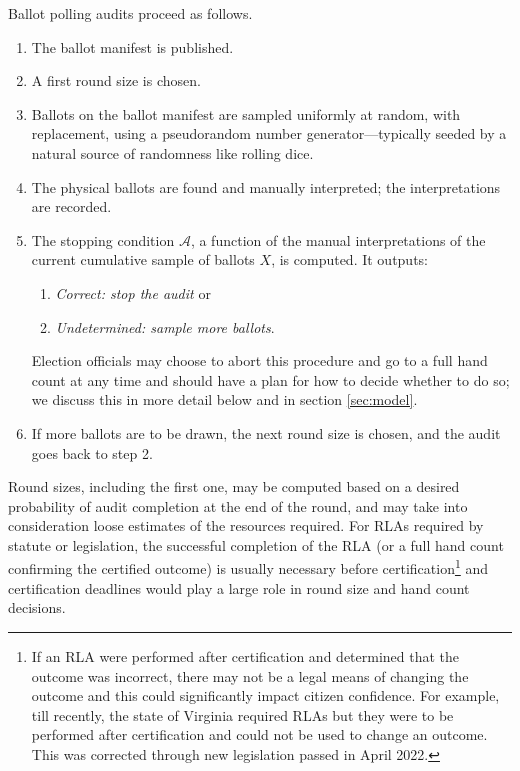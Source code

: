 Ballot polling audits proceed as follows. 
\begin{enumerate}
\item The ballot manifest is published. 
\item A first round size \cite{usenix_minerva} is chosen. %
\item Ballots on the ballot manifest are sampled uniformly at random, with replacement, using a pseudorandom number generator---typically seeded by a natural source of randomness like rolling dice.
\item The physical ballots are found and manually interpreted; the interpretations are recorded. 
\item The stopping condition $\mathcal{A}$, a function of the manual interpretations of the current cumulative sample of ballots $X$, is computed. It outputs: 
\begin{enumerate}
\item \emph{Correct: stop the audit} or 
\item \emph{Undetermined: sample more ballots}. 
\end{enumerate}
Election officials may choose to abort this procedure and go to a full hand count at any time and should have a plan for how to decide whether to do so; we discuss this in more detail below and in section \ref{sec:model}.     
\item If more ballots are to be drawn, the next round size is chosen, and the audit goes back to step 2. 
\end{enumerate} 

Round sizes, including the first one, may be computed based on a desired probability of audit completion at the end of the round, and may take into consideration loose estimates of the resources required. For RLAs required by statute or legislation, the successful completion of the RLA (or a full hand count confirming the certified outcome) is usually necessary before certification\footnote{If an RLA were performed after certification and determined that the outcome was incorrect, there may not be a legal means of changing the outcome and this could significantly impact citizen confidence. For example, till recently, the state of Virginia required RLAs but they were to be performed after certification and could not be used to change an outcome. This was corrected through new legislation passed in April 2022.} and certification deadlines would play a large role in round size and hand count decisions. 

